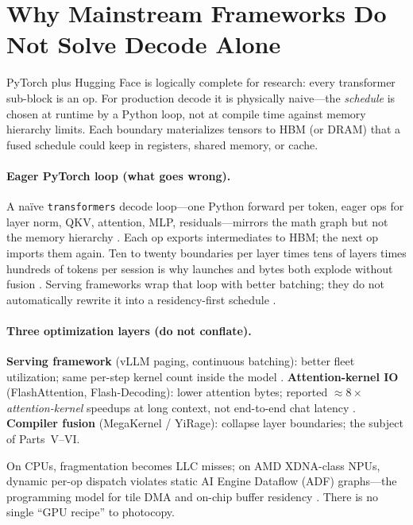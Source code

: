 \section{Why Mainstream Frameworks Do Not Solve Decode Alone}
\label{sec:framework_issues}

PyTorch plus Hugging Face is logically complete for research: every transformer sub-block is an op.
For production decode it is physically naive---the \emph{schedule} is chosen at runtime by a Python loop, not at compile time against memory hierarchy limits.
Each boundary materializes tensors to HBM (or DRAM) that a fused schedule could keep in registers, shared memory, or cache.


\paragraph{Eager PyTorch loop (what goes wrong).}
A na\"ive \texttt{transformers} decode loop---one Python forward per token, eager ops for layer norm, QKV, attention, MLP, residuals---mirrors the math graph but not the memory hierarchy \citep{taxbreak2026}.
Each op exports intermediates to HBM; the next op imports them again.
Ten to twenty boundaries per layer times tens of layers times hundreds of tokens per session is why launches and bytes both explode without fusion \citep{dao2022flashattention,yirage2026}.
Serving frameworks wrap that loop with better batching; they do not automatically rewrite it into a residency-first schedule \citep{kwon2023vllm}.

\paragraph{Three optimization layers (do not conflate).}
\textbf{Serving framework} (vLLM paging, continuous batching): better fleet utilization; same per-step kernel count inside the model \citep{kwon2023vllm,taxbreak2026}.
\textbf{Attention-kernel IO} (FlashAttention, Flash-Decoding): lower attention bytes; reported ${\approx}8\times$ \emph{attention-kernel} speedups at long context, not end-to-end chat latency \citep{dao2023flashdecoding}.
\textbf{Compiler fusion} (MegaKernel / YiRage): collapse layer boundaries; the subject of Parts~V--VI.

On CPUs, fragmentation becomes LLC misses; on AMD XDNA-class NPUs, dynamic per-op dispatch violates static AI Engine Dataflow (ADF) graphs---the programming model for tile DMA and on-chip buffer residency \citep{amd2024xdna,amd2024aie}.
There is no single ``GPU recipe'' to photocopy.


